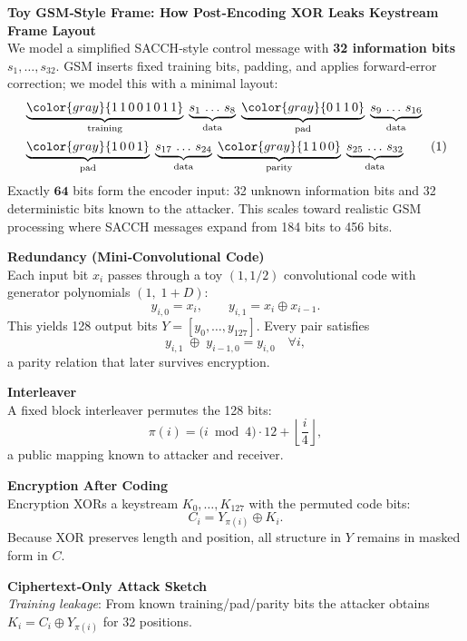 \begin{technical}
{\Large\textbf{Toy GSM‑Style Frame: How Post‑Encoding XOR Leaks Keystream}}\\[0.7em]

\noindent\textbf{Frame Layout}\\[0.5em]
We model a simplified SACCH‑style control message with \textbf{32 information bits} $s_1,\dots,s_{32}$.  
GSM inserts fixed training bits, padding, and applies forward‑error correction; we model this with a minimal layout:
\begin{align}
&\underbrace{\color{gray}{1\,1\,0\,0\,1\,0\,1\,1}}_{\text{training}}\;
\underbrace{s_1\,\dots\,s_8}_{\text{data}}\;
\underbrace{\color{gray}{0\,1\,1\,0}}_{\text{pad}}\;
\underbrace{s_9\,\dots\,s_{16}}_{\text{data}}\notag\\
&\underbrace{\color{gray}{1\,0\,0\,1}}_{\text{pad}}\;
\underbrace{s_{17}\,\dots\,s_{24}}_{\text{data}}\;
\underbrace{\color{gray}{1\,1\,0\,0}}_{\text{parity}}\;
\underbrace{s_{25}\,\dots\,s_{32}}_{\text{data}}
\tag{1}
\end{align}
Exactly \(\mathbf{64}\) bits form the encoder input: 32 unknown information bits and 32 deterministic bits known to the attacker. This scales toward realistic GSM processing where SACCH messages expand from 184 bits to 456 bits.

\noindent\textbf{Redundancy (Mini‑Convolutional Code)}\\[0.5em]
Each input bit \(x_i\) passes through a toy \((1,1/2)\) convolutional code with generator polynomials \((1,\;1+D)\):
\[
y_{i,0}=x_i,
\qquad
y_{i,1}=x_i \oplus x_{i-1}.
\]
This yields 128 output bits \(Y=[y_0,\dots,y_{127}]\).  Every pair satisfies
\[
y_{i,1}\;\oplus\;y_{i-1,0}=y_{i,0}
\quad\forall i,
\tag{2}
\]
a parity relation that later survives encryption.

\noindent\textbf{Interleaver}\\[0.5em]
A fixed block interleaver permutes the 128 bits:
\[
\pi(i)=\bigl(i\bmod4\bigr)\cdot12+\left\lfloor\frac{i}{4}\right\rfloor,
\tag{3}
\]
a public mapping known to attacker and receiver.

\noindent\textbf{Encryption After Coding}\\[0.5em]
Encryption XORs a keystream \(K_0,\dots,K_{127}\) with the permuted code bits:
\[
C_i = Y_{\pi(i)} \oplus K_i.
\tag{4}
\]
Because XOR preserves length and position, all structure in \(Y\) remains in masked form in \(C\).

\noindent\textbf{Ciphertext‑Only Attack Sketch}\\[0.5em]
\textit{Training leakage}: From known training/pad/parity bits the attacker obtains
\(K_i = C_i \oplus Y_{\pi(i)}\) for 32 positions.


\end{technical}
